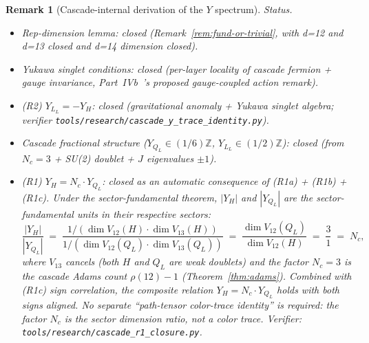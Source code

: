 \documentclass[12pt,a4paper]{article}
\newtheorem{remark}[theorem]{Remark}
\begin{document}
\begin{remark}[Cascade-internal derivation of the $Y$ spectrum]
\medskip\noindent\emph{Status.}
\begin{itemize}
\item \emph{Rep-dimension lemma}: closed
(Remark~\ref{rem:fund-or-trivial}, with d=12 and d=13 closed and
d=14 dimension closed).
\item \emph{Yukawa singlet conditions}: closed (per-layer locality
of cascade fermion + gauge invariance, Part~IVb~\cite{part4b}'s
proposed gauge-coupled action remark).
\item \emph{(R2) $Y_{L_L} = -Y_H$}: closed (gravitational anomaly
+ Yukawa singlet algebra; verifier
\texttt{tools/research/cascade\_y\_trace\_identity.py}).
\item \emph{Cascade fractional structure}
($Y_{Q_L} \in (1/6)\mathbb{Z}$, $Y_{L_L} \in (1/2)\mathbb{Z}$):
closed (from $N_c = 3$ + SU(2) doublet + $J$ eigenvalues $\pm 1$).
\item \emph{(R1) $Y_H = N_c \cdot Y_{Q_L}$}: closed as an
\emph{automatic consequence} of (R1a) + (R1b) + (R1c).  Under the
sector-fundamental theorem, $|Y_H|$ and $|Y_{Q_L}|$ are the
sector-fundamental units in their respective sectors:
\[
\frac{|Y_H|}{|Y_{Q_L}|} \;=\;
\frac{1/(\dim V_{12}(H)\cdot\dim V_{13}(H))}{1/(\dim V_{12}(Q_L)\cdot\dim V_{13}(Q_L))}
\;=\; \frac{\dim V_{12}(Q_L)}{\dim V_{12}(H)}
\;=\; \frac{3}{1} \;=\; N_c,
\]
where $V_{13}$ cancels (both $H$ and $Q_L$ are weak doublets) and the
factor $N_c=3$ is the cascade Adams count $\rho(12)-1$ (Theorem~\ref{thm:adams}).
Combined with (R1c) sign correlation, the composite relation
$Y_H=N_c\cdot Y_{Q_L}$ holds with both signs aligned.  No separate
``path-tensor color-trace identity'' is required: the factor $N_c$ is
the \emph{sector dimension ratio}, not a color trace.  Verifier:
\texttt{tools/research/cascade\_r1\_closure.py}.


\end{itemize}
\end{remark}
\end{document}
